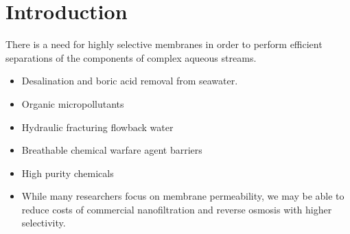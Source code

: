 \documentclass[journal=jpcbfk,manuscript=article]{achemso}
\begin{document}
  
  \section{Introduction}
  
  There is a need for highly selective membranes in order to perform efficient 
  separations of the components of complex aqueous streams.
  \begin{itemize}
    \item Desalination and boric acid removal from seawater.
    \item Organic micropollutants
    \item Hydraulic fracturing flowback water
    \item Breathable chemical warfare agent barriers
    \item High purity chemicals
    \item While many researchers focus on membrane permeability, we may be 
    able to reduce costs of commercial nanofiltration and reverse osmosis with
    higher selectivity.~\cite{werber_materials_2016}
  \end{itemize}
  
\end{document}
